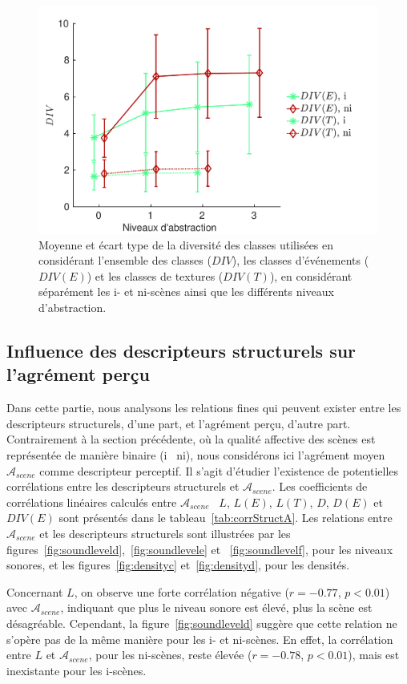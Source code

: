 \begin{figure}[t]
        \myfloatalign
        \includegraphics[width=.8\linewidth]{gfx/ch_5/xp1_div_1}
       \caption{Moyenne et écart type de la diversité des classes utilisées en considérant l'ensemble des classes ($DIV$), les classes d'événements ($DIV(E)$) et les classes de textures ($DIV(T)$), en considérant séparément les i- et ni-scènes ainsi que les différents niveaux d'abstraction.}\label{fig:diversity}
\end{figure}

\subsection[Descripteurs structurels et agrément perçu]{Influence des descripteurs structurels sur l'agrément perçu}
\label{sec:ch5_corrDesStruct}

Dans cette partie, nous analysons les relations fines qui peuvent exister entre les descripteurs structurels, d'une part, et l'agrément perçu, d'autre part. Contrairement à la section précédente, où la qualité affective des scènes est représentée de manière binaire (i \vs~ni), nous considérons ici l'agrément moyen $\mathcal{A}_{scene}$ comme descripteur perceptif. Il s'agit d'étudier l'existence de potentielles corrélations entre les descripteurs structurels et $\mathcal{A}_{scene}$. Les coefficients de corrélations linéaires calculés entre $\mathcal{A}_{scene}$ \vs~$L$, $L(E)$, $L(T)$, $D$, $D(E)$ et $DIV(E)$ sont présentés dans le tableau~\ref{tab:corrStructA}. Les relations entre $\mathcal{A}_{scene}$ et les descripteurs structurels sont illustrées par les figures~\ref{fig:soundleveld},~\ref{fig:soundlevele} et ~\ref{fig:soundlevelf}, pour les niveaux sonores, et les figures~\ref{fig:densityc} et~\ref{fig:densityd}, pour les densités. 

Concernant $L$, on observe une forte corrélation négative ($r=-0.77$, $p<0.01$) avec $\mathcal{A}_{scene}$, indiquant que plus le niveau sonore est élevé, plus la scène est désagréable. Cependant, la figure~\ref{fig:soundleveld} suggère que cette relation ne s'opère pas de la même manière pour les i- et ni-scènes. En effet, la corrélation entre $L$ et $\mathcal{A}_{scene}$, pour les ni-scènes, reste élevée ($r=-0.78$, $p<0.01$), mais est inexistante pour les i-scènes. 

